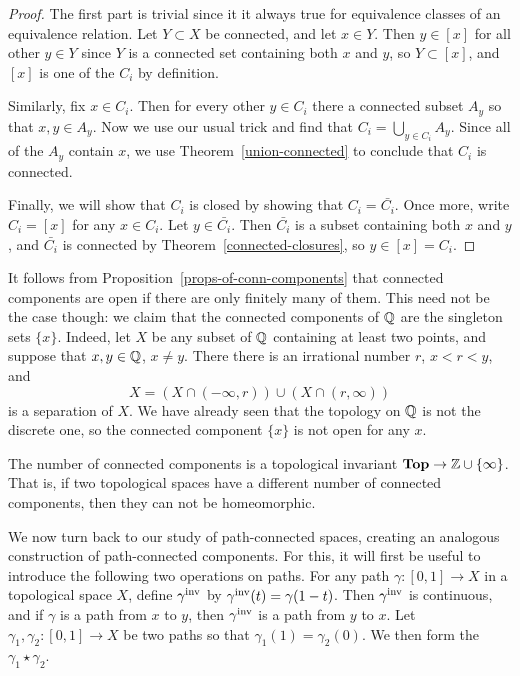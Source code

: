 \begin{proof}
  The first part is trivial since it it always true for equivalence classes of an equivalence relation. Let $Y \subset X$ be connected, and let $x \in Y$. Then $y \in [x]$ for all other $y \in Y$ since $Y$ is a connected set containing both $x$ and $y$, so $Y \subset [x]$, and $[x]$ is one of the $C_i$ by definition.
  
  Similarly, fix $x \in C_i$. Then for every other $y \in C_i$ there a connected subset $A_y$ so that $x, y \in A_y$. Now we use our usual trick and find that $C_i = \bigcup_{y \in C_i} A_y$. Since all of the $A_y$ contain $x$, we use Theorem~\ref{union-connected} to conclude that $C_i$ is connected.
  
  Finally, we will show that $C_i$ is closed by showing that $C_i = \bar{C_i}$. Once more, write $C_i = [x]$ for any $x \in C_i$. Let $y \in \bar{C_i}$. Then $\bar{C_i}$ is a subset containing both $x$ and $y$, and $\bar{C_i}$ is connected by Theorem~\ref{connected-closures}, so $y \in [x] = C_i$.
\end{proof}
\begin{example}
  It follows from Proposition~\ref{props-of-conn-components} that connected components are open if there are only finitely many of them. This need not be the case though: we claim that the connected components of $\mathbb{Q}$ are the singleton sets $\{x\}$. Indeed, let $X$ be any subset of $\mathbb{Q}$ containing at least two points, and suppose that $x, y \in \mathbb{Q}$, $x \not= y$. There there is an irrational number $r$, $x < r < y$, and 
  \[
    X = (X \cap (-\infty,r)) \cup (X \cap (r,\infty))
  \]
  is a separation of $X$. We have already seen that the topology on $\mathbb{Q}$ is not the discrete one, so the connected component $\{x\}$ is not open for any $x$.
\end{example}
\begin{rem}
  The number of connected components is a topological invariant $\mathbf{Top} \to \mathbb{Z} \cup \{\infty\}$. That is, if two topological spaces have a different number of connected components, then they can not be homeomorphic.
\end{rem}

We now turn back to our study of path-connected spaces, creating an analogous construction of path-connected components. For this, it will first be useful to introduce the following two operations on paths. For any path $\gamma : [0,1] \to X$ in a topological space $X$, define $\gamma^{\mathrm{inv}}$ by $\gamma^{\mathrm{inv}}(t) = \gamma(1-t)$. Then $\gamma^{\mathrm{inv}}$ is continuous, and if $\gamma$ is a path from $x$ to $y$, then $\gamma^{\mathrm{inv}}$ is a path from $y$ to $x$. Let $\gamma_1,\gamma_2 : [0,1] \to X$ be two paths so that $\gamma_1(1) = \gamma_2(0)$. We then form the  $\gamma_1 \star \gamma_2$.
